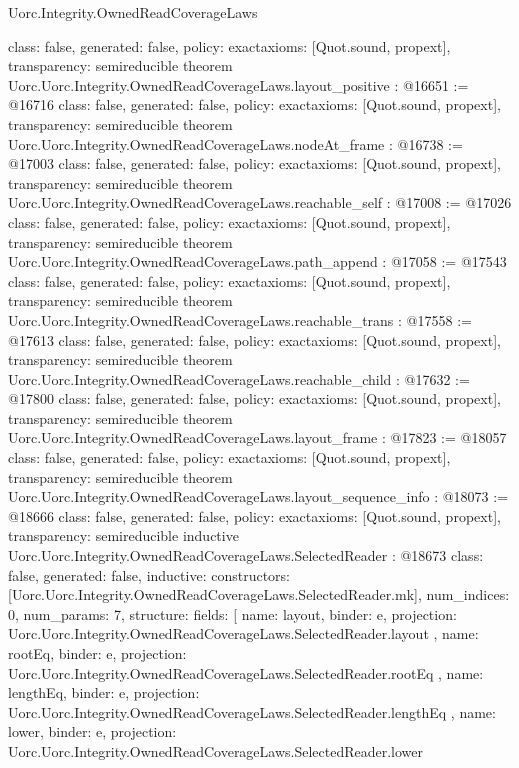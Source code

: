 \begin{lexlean}{Uorc.Integrity.OwnedReadCoverageLaws}
\begin{coremodule}
{  class: false,
  generated: false,
  policy: exact{axioms: [Quot.sound, propext]},
  transparency: semireducible
}
theorem Uorc.Uorc.Integrity.OwnedReadCoverageLaws.layout_positive : @16651 := @16716 {
  class: false,
  generated: false,
  policy: exact{axioms: [Quot.sound, propext]},
  transparency: semireducible
}
theorem Uorc.Uorc.Integrity.OwnedReadCoverageLaws.nodeAt_frame : @16738 := @17003 {
  class: false,
  generated: false,
  policy: exact{axioms: [Quot.sound, propext]},
  transparency: semireducible
}
theorem Uorc.Uorc.Integrity.OwnedReadCoverageLaws.reachable_self : @17008 := @17026 {
  class: false,
  generated: false,
  policy: exact{axioms: [Quot.sound, propext]},
  transparency: semireducible
}
theorem Uorc.Uorc.Integrity.OwnedReadCoverageLaws.path_append : @17058 := @17543 {
  class: false,
  generated: false,
  policy: exact{axioms: [Quot.sound, propext]},
  transparency: semireducible
}
theorem Uorc.Uorc.Integrity.OwnedReadCoverageLaws.reachable_trans : @17558 := @17613 {
  class: false,
  generated: false,
  policy: exact{axioms: [Quot.sound, propext]},
  transparency: semireducible
}
theorem Uorc.Uorc.Integrity.OwnedReadCoverageLaws.reachable_child : @17632 := @17800 {
  class: false,
  generated: false,
  policy: exact{axioms: [Quot.sound, propext]},
  transparency: semireducible
}
theorem Uorc.Uorc.Integrity.OwnedReadCoverageLaws.layout_frame : @17823 := @18057 {
  class: false,
  generated: false,
  policy: exact{axioms: [Quot.sound, propext]},
  transparency: semireducible
}
theorem Uorc.Uorc.Integrity.OwnedReadCoverageLaws.layout_sequence_info : @18073 := @18666 {
  class: false,
  generated: false,
  policy: exact{axioms: [Quot.sound, propext]},
  transparency: semireducible
}
inductive Uorc.Uorc.Integrity.OwnedReadCoverageLaws.SelectedReader : @18673 {
  class: false,
  generated: false,
  inductive: {
    constructors: [Uorc.Uorc.Integrity.OwnedReadCoverageLaws.SelectedReader.mk],
    num_indices: 0,
    num_params: 7,
    structure: {
      fields: [
        {
          name: layout,
          binder: e,
          projection: Uorc.Uorc.Integrity.OwnedReadCoverageLaws.SelectedReader.layout
        },
        {
          name: rootEq,
          binder: e,
          projection: Uorc.Uorc.Integrity.OwnedReadCoverageLaws.SelectedReader.rootEq
        },
        {
          name: lengthEq,
          binder: e,
          projection: Uorc.Uorc.Integrity.OwnedReadCoverageLaws.SelectedReader.lengthEq
        },
        {
          name: lower,
          binder: e,
          projection: Uorc.Uorc.Integrity.OwnedReadCoverageLaws.SelectedReader.lower
}}}}
\end{coremodule}
\end{lexlean}
